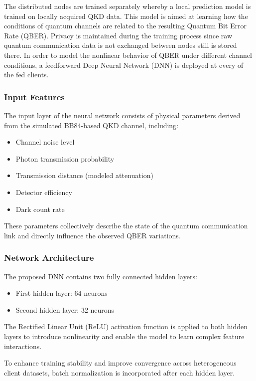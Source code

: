 \documentclass[conference]{IEEEtran}
\begin{document}
The distributed nodes are trained separately whereby a local prediction model is trained on locally acquired QKD data. This model is aimed at learning how the conditions of quantum channels are related to the resulting Quantum Bit Error Rate (QBER). Privacy is maintained during the training process since raw quantum communication data is not exchanged between nodes still is stored there.
In order to model the nonlinear behavior of QBER under different channel conditions, a feedforward Deep Neural Network (DNN) is deployed at every of the fed clients. 

\subsubsection{ Input Features}
The input layer of the neural network consists of physical parameters derived from the simulated BB84-based QKD channel, including:

\begin{itemize}
    \item Channel noise level
    \item Photon transmission probability
    \item Transmission distance (modeled attenuation)
    \item Detector efficiency
    \item Dark count rate
\end{itemize}

These parameters collectively describe the state of the quantum communication link and directly influence the observed QBER variations.

\subsubsection{ Network Architecture}

The proposed DNN contains two fully connected hidden layers:

\begin{itemize}
    \item First hidden layer: 64 neurons
    \item Second hidden layer: 32 neurons
\end{itemize}
The Rectified Linear Unit (ReLU) activation function is applied to both hidden layers to introduce nonlinearity and enable the model to learn complex feature interactions.

To enhance training stability and improve convergence across heterogeneous client datasets, batch normalization is incorporated after each hidden layer.
\end{document}
